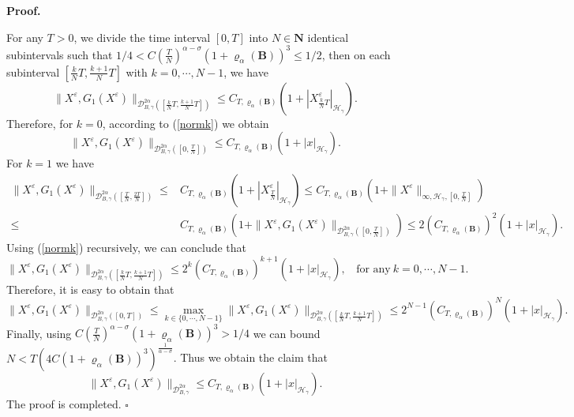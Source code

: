 \documentclass[10pt,a4paper]{article}
\numberwithin{equation}{section}
\newenvironment{proof}[1][\normalfont\bfseries Proof]{%
	\noindent #1.\hspace{0.5em}%
	\ignorespaces%
}{%
	\hfill $\square$%
	\par%
}
\begin{document}
\begin{proof}
	
		For any $T>0$, we divide the time interval $[0,T]$ into $N \in \mathbf N$ identical subintervals such that $   1/4 < C {(\frac T N)}^{\alpha-\sigma} (1+\varrho_{\alpha}(\mathbf{B}))^3 \leq 1/2$,
		then on each subinterval $\left[\frac kN T,\frac {k+1}N T \right]$ with $k=0, \cdots , N-1$, we have
		\begin{equation}\label{normk}
			\|X^\varepsilon,G_1(X^\varepsilon)\|_{\mathcal{D}_{B,\gamma}^{2\alpha}([\frac kN T,\frac {k+1}N T])}
			\leq  C_{T,\varrho_{\alpha}(\mathbf{B}) } \left(1+ \left|X^\varepsilon_{\frac kN T} \right|_{\mathcal H_\gamma} \right).
		\end{equation}
		Therefore, for $k=0$, according to (\ref{normk}) we obtain
		\begin{equation*}
			\|X^\varepsilon,G_1(X^\varepsilon)\|_{\mathcal{D}_{B,\gamma}^{2\alpha}([0,\frac TN])}
			\leq C_{T,\varrho_{\alpha}(\mathbf{B}) } (1+|x|_{\mathcal H_\gamma}).
		\end{equation*}
		For $k=1$ we have
		\begin{align*}
			\|X^\varepsilon,G_1(X^\varepsilon)\|_{\mathcal{D}_{B,\gamma}^{2\alpha}([\frac TN,\frac {2T}N ])  }
			\leq & C_{T,\varrho_{\alpha}(\mathbf{B}) } \left(1+\left|X_{\frac TN}^\varepsilon \right|_{\mathcal H_\gamma} \right)
			\leq C_{T,\varrho_{\alpha}(\mathbf{B}) } \left( 1+\|X^\varepsilon\|_{\infty,\mathcal H_\gamma, [0,\frac TN]} \right) \nonumber\\
			\leq & C_{T,\varrho_{\alpha}(\mathbf{B}) } \left(1+\|X^\varepsilon,G_1(X^\varepsilon)\|_{\mathcal{D}_{B,\gamma}^{2\alpha}([0,\frac TN])} \right)
			\leq 2(C_{T,\varrho_{\alpha}(\mathbf{B}) })^2 (1+|x|_{\mathcal H_\gamma}).
		\end{align*}
		Using (\ref{normk}) recursively, we can conclude that
		\begin{equation}\label{xk}
			\|X^\varepsilon,G_1(X^\varepsilon)\|_{\mathcal{D}_{B,\gamma}^{2\alpha}([\frac kN T,\frac {k+1}N T])}
			\leq 2^k(C_{T,\varrho_{\alpha}(\mathbf{B})})^{k+1} (1+|x|_{\mathcal H_\gamma}), ~~~~\text{for any}~ k=0,\cdots, N-1.
		\end{equation}
		Therefore, it is easy to obtain that
		\begin{equation*}
			\|X^\varepsilon,G_1(X^\varepsilon)\|_{\mathcal{D}_{B,\gamma}^{2\alpha}([0,T])}
			\leq  \max_{k\in \{0, \cdots,N-1\}} \|X^\varepsilon,G_1(X^\varepsilon)\|_{\mathcal{D}_{B,\gamma}^{2\alpha}([\frac kN T,\frac {k+1}N T])}
			\leq 2^{N-1} (C_{T,\varrho_{\alpha}(\mathbf{B})})^{N} (1+|x|_{\mathcal H_\gamma}) .
		\end{equation*}
		Finally, using $  C {(\frac T N)}^{\alpha-\sigma} (1+\varrho_{\alpha}(\mathbf{B}))^3>1/4 $ we can bound
		$N < T (4 C (1+\varrho_{\alpha}(\mathbf{B}))^3)^{ \frac 1{\alpha-\sigma}}$.
		Thus we obtain the claim that
			\begin{equation*}
			\|X^\varepsilon,G_1(X^\varepsilon)\|_{\mathcal{D}_{B,\gamma}^{2\alpha}} \leq  C_{T,\varrho_{\alpha}(\mathbf{B}) } (1+|x|_{\mathcal H_\gamma}).
		\end{equation*}
	The proof is completed.
	\end{proof}
	
\end{document}
